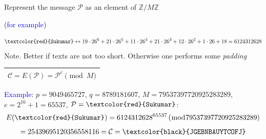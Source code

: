 \documentclass[landscape,display]{powersem} %
\newcommand{\heading}[1]{%
 \begin{center}
  \large\bf
  \shadowbox{{\textcolor{conceptcolor}{#1}}}%
 \end{center}
 \vspace{1ex minus 1ex}}
\begin{document}
\begin{slide}
\heading{Alice: Encryption}\pause

Represent the message ${\mathcal P}$ as an element of  ${\mathbb Z}/M{\mathbb Z}$\pause

(\textcolor{blue}{for example})\pause
\begin{scriptsize}
$$\texttt{\textcolor{red}{Sukumar}}\leftrightarrow
19\cdot26^6+21\cdot26^5+11\cdot26^4+21\cdot26^3+12\cdot26^2+1\cdot26+18=
                          6124312628$$ Note. Better if texts are not too short. Otherwise one performs
some  \textsl{padding}
\end{scriptsize}\pause

\begin{Large}
\begin{center}\begin{tabular}{|c|}\hline
${\mathcal C}=E({\mathcal P})={\mathcal P}^e\pmod M$\\\hline\end{tabular}\end{center}
\end{Large}\pause

\scriptsize{ \textcolor{blue}{Example}: $p=9049465727$,
$q=8789181607$, $M=79537397720925283289 $, $e=2^{16}+1=65537$,
${\mathcal P}=\texttt{\textcolor{red}{Sukumar}}$:\pause
$$E(\texttt{\textcolor{red}{Sukumar}})=6124312628^{65537}\,(\bmod 79537397720925283289)$$
$$=25439695120356558116={\mathcal C}=\texttt{\textcolor{black}{JGEBNBAUYTCOFJ}}\hfill$$}
\end{slide}
\end{document}
